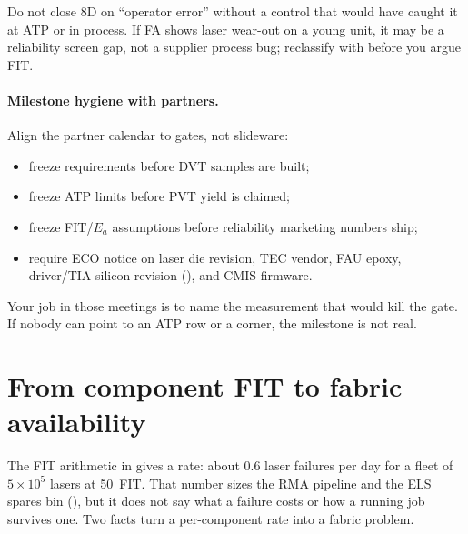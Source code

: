 Do not close 8D on ``operator error'' without a control that would have caught it
at ATP or in process. If FA shows laser wear-out on a young unit, it may be a
reliability screen gap, not a supplier process bug; reclassify with
 before you argue FIT.

\paragraph{Milestone hygiene with partners.}
Align the partner calendar to gates, not slideware:

\begin{itemize}
\item freeze requirements before DVT samples are built;
\item freeze ATP limits before PVT yield is claimed;
\item freeze FIT/$E_a$ assumptions before reliability marketing numbers ship;
\item require ECO notice on laser die revision, TEC vendor, FAU epoxy, driver/TIA
      silicon revision (), and CMIS firmware.
\end{itemize}

Your job in those meetings is to name the measurement that would kill the gate.
If nobody can point to an ATP row or a corner, the milestone is not real.


\section{From component FIT to fabric availability}
\label{sec:fabric-availability}

The FIT arithmetic in  gives a rate: about $0.6$ laser
failures per day for a fleet of $5\times10^5$ lasers at 50~FIT. That number sizes
the RMA pipeline and the ELS spares bin (), but it does not say
what a failure costs or how a running job survives one. Two facts turn a
per-component rate into a fabric problem.

